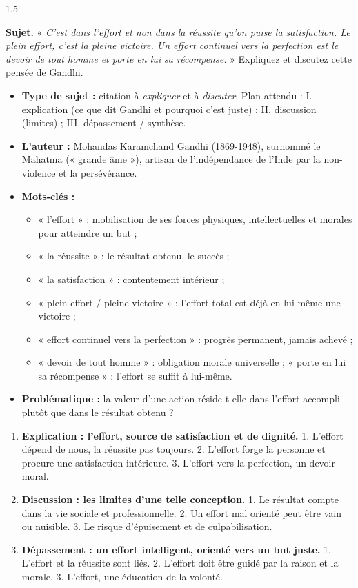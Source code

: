 \documentclass[12pt]{article}
\begin{document}
\begin{spacing}{1.5}

\noindent\textbf{Sujet.} « \emph{C'est dans l'effort et non dans la réussite qu'on puise la satisfaction. Le plein effort, c'est la pleine victoire. Un effort continuel vers la perfection est le devoir de tout homme et porte en lui sa récompense.} » Expliquez et discutez cette pensée de Gandhi.


\begin{itemize}
\item \textbf{Type de sujet :} citation à \emph{expliquer} et à \emph{discuter}. Plan attendu : I. explication (ce que dit Gandhi et pourquoi c'est juste) ; II. discussion (limites) ; III. dépassement / synthèse.
\item \textbf{L'auteur :} Mohandas Karamchand Gandhi (1869-1948), surnommé le Mahatma (« grande âme »), artisan de l'indépendance de l'Inde par la non-violence et la persévérance.
\item \textbf{Mots-clés :}
  \begin{itemize}
  \item « l'effort » : mobilisation de ses forces physiques, intellectuelles et morales pour atteindre un but ;
  \item « la réussite » : le résultat obtenu, le succès ;
  \item « la satisfaction » : contentement intérieur ;
  \item « plein effort / pleine victoire » : l'effort total est déjà en lui-même une victoire ;
  \item « effort continuel vers la perfection » : progrès permanent, jamais achevé ;
  \item « devoir de tout homme » : obligation morale universelle ; « porte en lui sa récompense » : l'effort se suffit à lui-même.
  \end{itemize}
\item \textbf{Problématique :} la valeur d'une action réside-t-elle dans l'effort accompli plutôt que dans le résultat obtenu ?
\end{itemize}


\begin{enumerate}
\item[I.] \textbf{Explication : l'effort, source de satisfaction et de dignité.} 1. L'effort dépend de nous, la réussite pas toujours. 2. L'effort forge la personne et procure une satisfaction intérieure. 3. L'effort vers la perfection, un devoir moral.
\item[II.] \textbf{Discussion : les limites d'une telle conception.} 1. Le résultat compte dans la vie sociale et professionnelle. 2. Un effort mal orienté peut être vain ou nuisible. 3. Le risque d'épuisement et de culpabilisation.
\item[III.] \textbf{Dépassement : un effort intelligent, orienté vers un but juste.} 1. L'effort et la réussite sont liés. 2. L'effort doit être guidé par la raison et la morale. 3. L'effort, une éducation de la volonté.
\end{enumerate}


\end{spacing}
\end{document}
